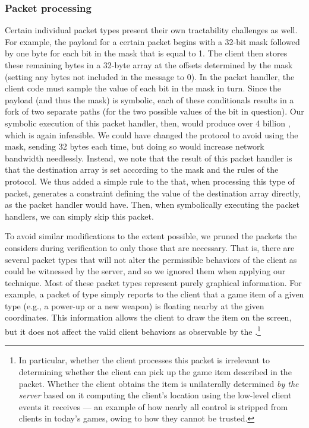 \subsubsection{Packet processing} Certain individual packet types present
their own tractability challenges as well.  For example, the payload
for a certain packet begins with a 32-bit mask followed by one byte
for each bit in the mask that is equal to 1.  The client then stores
these remaining bytes in a 32-byte array at the offsets determined by
the mask (setting any bytes not included in the message to 0).  In the
packet handler, the \xpilot client code must sample the value of each
bit in the mask in turn.  Since the payload (and thus the mask) is
symbolic, each of these conditionals results in a fork of two separate
paths (for the two possible values of the bit in question).  Our
symbolic execution of this packet handler, then, would produce over 4
billion \pathsegcons, which is again infeasible.  We could have
changed the \xpilot protocol to avoid using the mask, sending 32 bytes
each time, but doing so would increase network bandwidth needlessly.
Instead, we note that the result of this packet handler is that the
destination array is set according to the mask and the rules of the
protocol.  We thus added a simple rule to the \verifier that, when
processing this type of packet, generates a constraint defining the
value of the destination array directly, as the packet handler would
have.  Then, when symbolically executing the packet handlers, we can
simply skip this packet.

To avoid similar modifications to the extent possible, we pruned the
packets the \verifier considers during verification to only those that
are necessary.  That is, there are several packet types that will not
alter the permissible behaviors of the client as could be witnessed by
the server, and so we ignored them when applying our technique.  Most
of these packet types represent purely graphical information.  For
example, a packet of type \pktitem simply reports to the client that a
game item of a given type (e.g., a power-up or a new weapon) is
floating nearby at the given coordinates.  This information allows the
client to draw the item on the screen, but it does not affect the
valid client behaviors as observable by the \verifier.\footnote{In
  particular, whether the client processes this packet is irrelevant
  to determining whether the client can pick up the game item
  described in the packet.  Whether the client obtains the item is
  unilaterally determined {\em by the server} based on it computing
  the client's location using the low-level client events it receives
  --- an example of how nearly all control is stripped from clients in
  today's games, owing to how they cannot be trusted.}

